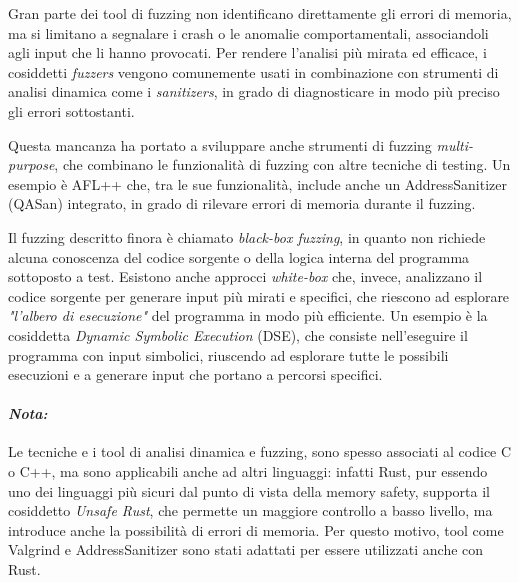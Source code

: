 Gran parte dei tool di fuzzing non identificano direttamente gli errori di
memoria, ma si limitano a segnalare i crash o le anomalie comportamentali,
associandoli agli input che li hanno provocati. Per rendere l'analisi più mirata
ed efficace, i cosiddetti \textit{fuzzers} vengono comunemente usati in combinazione
con strumenti di analisi dinamica come i \textit{sanitizers}, in grado di diagnosticare
in modo più preciso gli errori sottostanti.

Questa mancanza ha portato a sviluppare anche strumenti di fuzzing \textit{multi-purpose},
che combinano le funzionalità di fuzzing con altre tecniche di testing. Un
esempio è AFL++\cite{afl_plus_plus} che, tra le sue funzionalità, include anche un
AddressSanitizer (QASan\cite{qasan}) integrato, in grado di rilevare errori di memoria
durante il fuzzing.

Il fuzzing descritto finora è chiamato \textit{black-box fuzzing}, in quanto non
richiede alcuna conoscenza del codice sorgente o della logica interna del programma
sottoposto a test. Esistono anche approcci \textit{white-box} che, invece, analizzano
il codice sorgente per generare input più mirati e specifici, che riescono ad
esplorare \textit{"l'albero di esecuzione"} del programma in modo più efficiente.
Un esempio è la cosiddetta \textit{Dynamic Symbolic Execution} (DSE), che
consiste nell'eseguire il programma con input simbolici, riuscendo ad esplorare
tutte le possibili esecuzioni e a generare input che portano a percorsi
specifici.

\bigskip
\noindent

\paragraph{\textit{Nota:}}
Le tecniche e i tool di analisi dinamica e fuzzing, sono spesso associati al codice
C o C++, ma sono applicabili anche ad altri linguaggi: infatti Rust, pur essendo
uno dei linguaggi più sicuri dal punto di vista della memory safety, supporta il
cosiddetto \textit{Unsafe Rust}, che permette un maggiore controllo a basso livello,
ma introduce anche la possibilità di errori di memoria. Per questo motivo, tool
come Valgrind e AddressSanitizer sono stati adattati per essere utilizzati anche
con Rust.\cite{valgrind_rust}\cite{rust_manual_san}